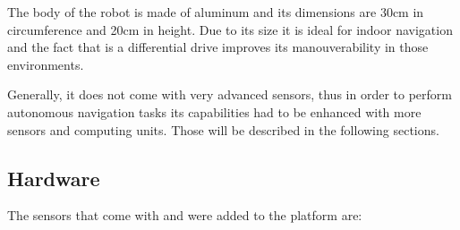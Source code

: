 The body of the robot is made of aluminum and its dimensions are 30cm in circumference and 20cm in height. Due to its size it is ideal for indoor navigation and the fact that is a differential drive improves its manouverability in those environments. 

Generally, it does not come with very advanced sensors, thus in order to perform autonomous navigation tasks its capabilities had to be enhanced with more sensors and computing units. Those will be described in the following sections.

\subsection{Hardware}

The sensors that come with and were added to the platform are:
